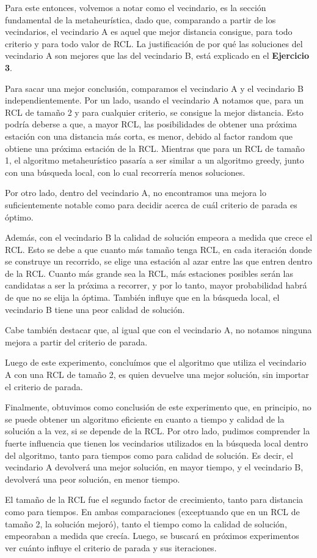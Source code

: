 Para este entonces, volvemos a notar como el vecindario, es la sección fundamental de la metaheurística, dado que, comparando a partir de los vecindarios, el vecindario A es aquel que mejor distancia consigue, para todo criterio y para todo valor de RCL. La justificación de por qué las soluciones del vecindario A son mejores que las del vecindario B, está explicado en el \textbf{Ejercicio 3}. 
\par Para sacar una mejor conclusión, comparamos el vecindario A y el vecindario B independientemente. 
Por un lado, usando el vecindario A notamos que, para un RCL de tamaño 2 y para cualquier criterio, se consigue la mejor distancia. Esto podría deberse a que, a mayor RCL, las posibilidades de obtener una próxima estación con una distancia más corta, es menor, debido al factor random que obtiene una próxima estación de la RCL. Mientras que para un RCL de tamaño 1, el algoritmo metaheurístico pasaría a ser similar a un algoritmo greedy, junto con una búsqueda local, con lo cual recorrería menos soluciones. 
\par Por otro lado, dentro del vecindario A, no encontramos una mejora lo suficientemente notable como para decidir acerca de cuál criterio de parada es óptimo. 
\par Además, con el vecindario B la calidad de solución empeora a medida que crece el RCL. Esto se debe a que cuanto más tamaño tenga RCL, en cada iteración donde se construye un recorrido, se elige una estación al azar entre las que entren dentro de la RCL. Cuanto más grande sea la RCL, más estaciones posibles serán las candidatas a ser la próxima a recorrer, y por lo tanto, mayor probabilidad habrá de que no se elija la óptima. 
También influye que en la búsqueda local, el vecindario B tiene una peor calidad de solución. 
\par Cabe también destacar que, al igual que con el vecindario A, no notamos ninguna mejora a partir del criterio de parada. 
\par Luego de este experimento, concluímos que el algoritmo que utiliza el vecindario A con una RCL de tamaño 2, es quien devuelve una mejor solución, sin importar el criterio de parada.


\par Finalmente, obtuvimos como conclusión de este experimento que, en principio, no se puede obtener un algoritmo eficiente en cuanto a tiempo y calidad de la solución a la vez, si se depende de la RCL. Por otro lado, pudimos comprender la fuerte influencia que tienen los vecindarios utilizados en la búsqueda local dentro del algoritmo, tanto para tiempos como para calidad de solución. Es decir, el vecindario A devolverá una mejor solución, en mayor tiempo, y el vecindario B, devolverá una peor solución, en menor tiempo. 
\par El tamaño de la RCL fue el segundo factor de crecimiento, tanto para distancia como para tiempos. En ambas comparaciones (exceptuando que en un RCL de tamaño 2, la solución mejoró), tanto el tiempo como la calidad de solución, empeoraban a medida que crecía. Luego, se buscará en próximos experimentos ver cuánto influye el criterio de parada y sus iteraciones.



